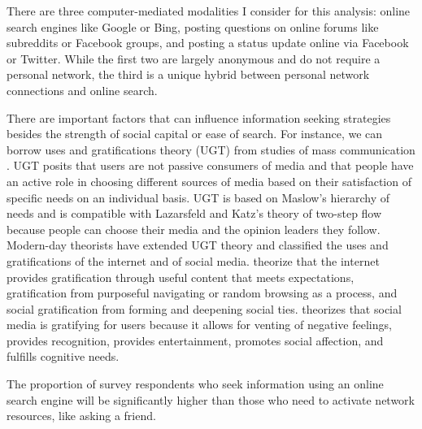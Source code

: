 There are three computer-mediated modalities I consider for this analysis: online
search engines like Google or Bing, posting questions on online forums like
subreddits or Facebook groups, and posting a status update online via Facebook
or Twitter. While the first two are largely anonymous and do not require a
personal network, the third is a unique hybrid between personal network
connections and online search.

There are important factors that can influence information seeking strategies
besides the strength of social capital or ease of search. For instance, we can
borrow uses and gratifications theory (UGT) from studies of mass communication
\citep{blumlerUsesMassCommunications1974, tanMassCommunicationTheories1985}. 
UGT posits that users are not passive consumers of media and that people have an
active role in choosing different sources of media based on their satisfaction
of specific needs on an individual basis. UGT is based on Maslow’s  
\citeyear{maslowTheoryHumanMotivation1943} hierarchy of needs and is compatible with
Lazarsfeld and Katz’s theory of two-step flow \cite{katzPersonalInfluencePart1955}
because people can choose their media and the opinion leaders they follow.
Modern-day theorists have extended UGT theory and classified the uses and
gratifications of the internet and of social media. 
\citet{staffordDeterminingUsesGratifications2004} theorize that the internet
provides gratification through useful content that meets expectations,
gratification from purposeful navigating or random browsing as a process, and
social gratification from forming and deepening social ties. 
\citet{leungGenerationalDifferencesContent2013} theorizes that social media is
gratifying for users because it allows for venting of negative feelings,
provides recognition, provides entertainment, promotes social affection, and
fulfills cognitive needs. 

\begin{hyp} \label{hyp:online-vs-network}
The proportion of survey respondents who seek information
using an online search engine will be significantly higher than those who
need to activate network resources, like asking a friend.
\end{hyp}


